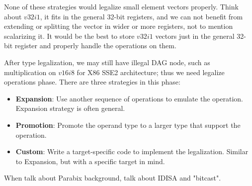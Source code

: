 None of these strategies would legalize small element vectors properly. Think about $v32i1$, it fits in the general 32-bit registers, and we can not benefit from extending or splitting the vector in wider or more registers, not to mention scalarizing it. It would be the best to store $v32i1$ vectors just in the general 32-bit register and properly handle the operations on them.

After type legalization, we may still have illegal DAG node, such as multiplication on $v16i8$ for X86 SSE2 architecture; thus we need legalize operations phase. There are three strategies in this phase:

\begin{itemize}
    \item \textbf{Expansion}: Use another sequence of operations to emulate the operation. Expansion strategy is often general.
    \item \textbf{Promotion}: Promote the operand type to a larger type that support the operation.
    \item \textbf{Custom}: Write a target-specific code to implement the legalization. Similar to Expansion, but with a specific target in mind.
\end{itemize}

When talk about Parabix background, talk about IDISA and "bitcast".
